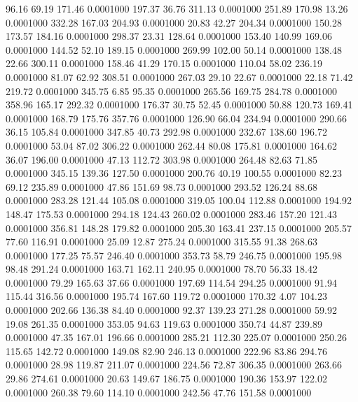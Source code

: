  96.16   69.19  171.46   0.0001000
 197.37   36.76  311.13   0.0001000
 251.89  170.98   13.26   0.0001000
 332.28  167.03  204.93   0.0001000
  20.83   42.27  204.34   0.0001000
 150.28  173.57  184.16   0.0001000
 298.37   23.31  128.64   0.0001000
 153.40  140.99  169.06   0.0001000
 144.52   52.10  189.15   0.0001000
 269.99  102.00   50.14   0.0001000
 138.48   22.66  300.11   0.0001000
 158.46   41.29  170.15   0.0001000
 110.04   58.02  236.19   0.0001000
  81.07   62.92  308.51   0.0001000
 267.03   29.10   22.67   0.0001000
  22.18   71.42  219.72   0.0001000
 345.75    6.85   95.35   0.0001000
 265.56  169.75  284.78   0.0001000
 358.96  165.17  292.32   0.0001000
 176.37   30.75   52.45   0.0001000
  50.88  120.73  169.41   0.0001000
 168.79  175.76  357.76   0.0001000
 126.90   66.04  234.94   0.0001000
 290.66   36.15  105.84   0.0001000
 347.85   40.73  292.98   0.0001000
 232.67  138.60  196.72   0.0001000
  53.04   87.02  306.22   0.0001000
 262.44   80.08  175.81   0.0001000
 164.62   36.07  196.00   0.0001000
  47.13  112.72  303.98   0.0001000
 264.48   82.63   71.85   0.0001000
 345.15  139.36  127.50   0.0001000
 200.76   40.19  100.55   0.0001000
  82.23   69.12  235.89   0.0001000
  47.86  151.69   98.73   0.0001000
 293.52  126.24   88.68   0.0001000
 283.28  121.44  105.08   0.0001000
 319.05  100.04  112.88   0.0001000
 194.92  148.47  175.53   0.0001000
 294.18  124.43  260.02   0.0001000
 283.46  157.20  121.43   0.0001000
 356.81  148.28  179.82   0.0001000
 205.30  163.41  237.15   0.0001000
 205.57   77.60  116.91   0.0001000
  25.09   12.87  275.24   0.0001000
 315.55   91.38  268.63   0.0001000
 177.25   75.57  246.40   0.0001000
 353.73   58.79  246.75   0.0001000
 195.98   98.48  291.24   0.0001000
 163.71  162.11  240.95   0.0001000
  78.70   56.33   18.42   0.0001000
  79.29  165.63   37.66   0.0001000
 197.69  114.54  294.25   0.0001000
  91.94  115.44  316.56   0.0001000
 195.74  167.60  119.72   0.0001000
 170.32    4.07  104.23   0.0001000
 202.66  136.38   84.40   0.0001000
  92.37  139.23  271.28   0.0001000
  59.92   19.08  261.35   0.0001000
 353.05   94.63  119.63   0.0001000
 350.74   44.87  239.89   0.0001000
  47.35  167.01  196.66   0.0001000
 285.21  112.30  225.07   0.0001000
 250.26  115.65  142.72   0.0001000
 149.08   82.90  246.13   0.0001000
 222.96   83.86  294.76   0.0001000
  28.98  119.87  211.07   0.0001000
 224.56   72.87  306.35   0.0001000
 263.66   29.86  274.61   0.0001000
  20.63  149.67  186.75   0.0001000
 190.36  153.97  122.02   0.0001000
 260.38   79.60  114.10   0.0001000
 242.56   47.76  151.58   0.0001000
